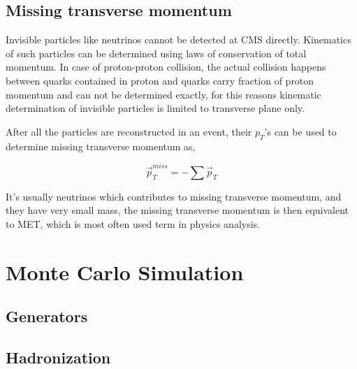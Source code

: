 \subsection{
  Missing transverse momentum
}

Invisible particles like neutrinos cannot be detected at \gls{CMS} directly.
Kinematics of such particles can be determined using laws of conservation of
total momentum. In case of proton-proton collision,
the actual collision happens between quarks contained in
proton and quarks carry fraction of proton momentum
and can not be determined exactly, for this reasons kinematic determination
of invisible particles is limited to transverse plane only.

After all the particles are reconstructed in an event, their \( p_T \)'s
can be used to determine missing transverse momentum as,

\begin{equation}
  \vec{p}_{T}^{miss} = - \sum \vec{p}_{T}
\end{equation}

It's usually neutrinos which contributes to missing transverse momentum,
and they have very small mass, the missing transverse momentum is then
equivalent to \gls{MET}, which is most often used term in physics analysis.

\section{
  Monte Carlo Simulation
 }

\subsection{
  Generators
}

\subsection{
  Hadronization
}

